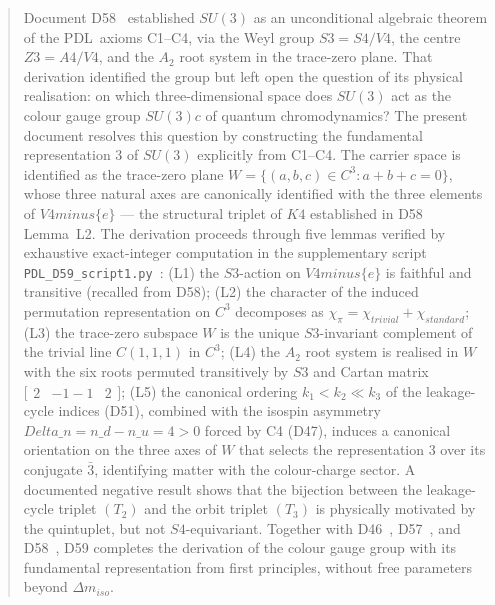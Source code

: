 \documentclass[11pt,a4paper]{article}
\def\\{}%
\def\Sfour{S4}%
\def\Vfour{V4}%
\def\Afour{A4}%
\def\Sthree{S3}%
\def\Zthree{Z3}%
\def\SUthree{SU(3)}%
\def\SUthreec{SU(3)c}%
\def\Kfour{K4}%
\def\PDL{PDL}%
\def\setminus{ minus }%
\def\mathbb#1{#1}%
\def\mathrm#1{#1}%
\def\mathbf#1{#1}%
\def\textsc#1{#1}%
\def\nuu{n\_u}%
\def\ndd{n\_d}%
\def\Dn{Delta\_n}%
\theoremstyle{plain}
\theoremstyle{definition}
\theoremstyle{remark}
\newcommand{\PDL}{\textsc{PDL}}
\newcommand{\Kfour}{K_4}
\newcommand{\Sfour}{S_4}
\newcommand{\Afour}{A_4}
\newcommand{\Vfour}{V_4}
\newcommand{\Sthree}{S_3}
\newcommand{\Zthree}{\mathbb{Z}_3}
\newcommand{\SUthree}{\mathrm{SU}(3)}
\newcommand{\SUthreec}{\mathrm{SU}(3)_c}
\newcommand{\nuu}{n_u}
\newcommand{\ndd}{n_d}
\newcommand{\Dn}{\Delta n}
\newcommand{\kone}{k_1}
\newcommand{\ktwo}{k_2}
\newcommand{\kthree}{k_3}
\newcommand{\Dm}{\Delta m}
\begin{document}
\begin{abstract}
Document D58~\cite{PDL_D58} established $\SUthree$ as an unconditional algebraic theorem of the \PDL\ axioms C1--C4, via the Weyl group $\Sthree = \Sfour/\Vfour$, the centre $\Zthree = \Afour/\Vfour$, and the $A_2$ root system in the trace-zero plane. That derivation identified the group but left open the question of its physical realisation: on which three-dimensional space does $\SUthree$ act as the colour gauge group $\SUthreec$ of quantum chromodynamics? The present document resolves this question by constructing the fundamental representation $\mathbf{3}$ of $\SUthree$ explicitly from C1--C4. The carrier space is identified as the trace-zero plane $W = \{(a,b,c) \in \mathbb{C}^3 : a+b+c=0\}$, whose three natural axes are canonically identified with the three elements of $\Vfour \setminus \{e\}$ --- the structural triplet of $\Kfour$ established in D58 Lemma~L2. The derivation proceeds through five lemmas verified by exhaustive exact-integer computation in the supplementary script \texttt{PDL\_D59\_script1.py}~\cite{PDL_D59_script1}: (L1) the $\Sthree$-action on $\Vfour \setminus \{e\}$ is faithful and transitive (recalled from D58); (L2) the character of the induced permutation representation on $\mathbb{C}^3$ decomposes as $\chi_\pi = \chi_{\mathrm{trivial}} + \chi_{\mathrm{standard}}$; (L3) the trace-zero subspace $W$ is the unique $\Sthree$-invariant complement of the trivial line $\mathbb{C}(1,1,1)$ in $\mathbb{C}^3$; (L4) the $A_2$ root system is realised in $W$ with the six roots permuted transitively by $\Sthree$ and Cartan matrix $\bigl[\begin{smallmatrix}2&-1\\-1&2\end{smallmatrix}\bigr]$; (L5) the canonical ordering $\kone < \ktwo \ll \kthree$ of the leakage-cycle indices (D51), combined with the isospin asymmetry $\Dn = \ndd - \nuu = 4 > 0$ forced by C4 (D47), induces a canonical orientation on the three axes of $W$ that selects the representation $\mathbf{3}$ over its conjugate $\bar{\mathbf{3}}$, identifying matter with the colour-charge sector. A documented negative result shows that the bijection between the leakage-cycle triplet $(T_2)$ and the orbit triplet $(T_3)$ is physically motivated by the quintuplet, but not $\Sfour$-equivariant. Together with D46~\cite{PDL_D46}, D57~\cite{PDL_D57}, and D58~\cite{PDL_D58}, D59 completes the derivation of the colour gauge group with its fundamental representation from first principles, without free parameters beyond $\Dm_{\mathrm{iso}}$.
\end{abstract}
\end{document}
